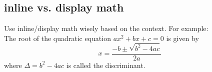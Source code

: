 \documentclass{article}
\begin{document}
\subsection{inline vs. display math}
Use inline/display math wisely based on the context. For example:\\

The root of the quadratic equation $ax^2+bx+c=0$ is given by
\[
x=\frac{-b\pm\sqrt{b^2-4ac}}{2a} %
\]
where $\Delta=b^2-4ac$ is called the discriminant.




\end{document}
